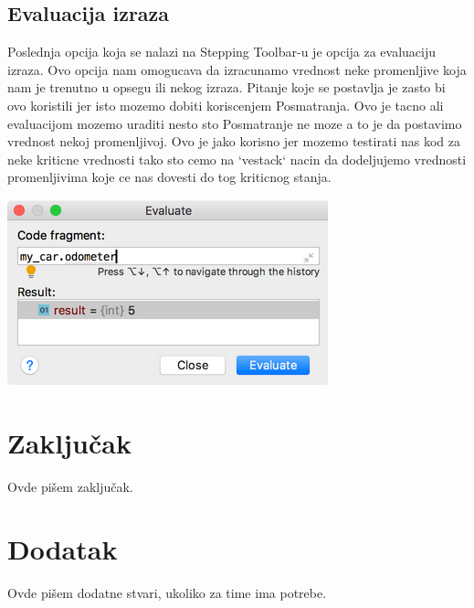 \documentclass[a4paper]{article}
\begin{document}
\subsection{Evaluacija izraza}
Poslednja opcija koja se nalazi na Stepping Toolbar-u je opcija za evaluaciju izraza. Ovo opcija nam omogucava da izracunamo vrednost neke promenljive  koja nam je trenutno u opsegu ili nekog izraza. Pitanje koje se postavlja je zasto bi ovo koristili jer isto mozemo dobiti koriscenjem Posmatranja. Ovo je tacno ali evaluacijom mozemo uraditi nesto sto Posmatranje ne moze a to je da postavimo vrednost nekoj promenljivoj. Ovo je jako korisno jer mozemo testirati nas kod za neke kriticne vrednosti tako sto cemo na `vestack` nacin da dodeljujemo vrednosti promenljivima koje ce nas dovesti do tog kriticnog stanja.

\includegraphics[scale = 0.4]{4}
\section{Zaključak}
\label{sec:zakljucak}

Ovde pišem zaključak. 


\appendix
 


\appendix
\section{Dodatak}
Ovde pišem dodatne stvari, ukoliko za time ima potrebe.
\end{document}
